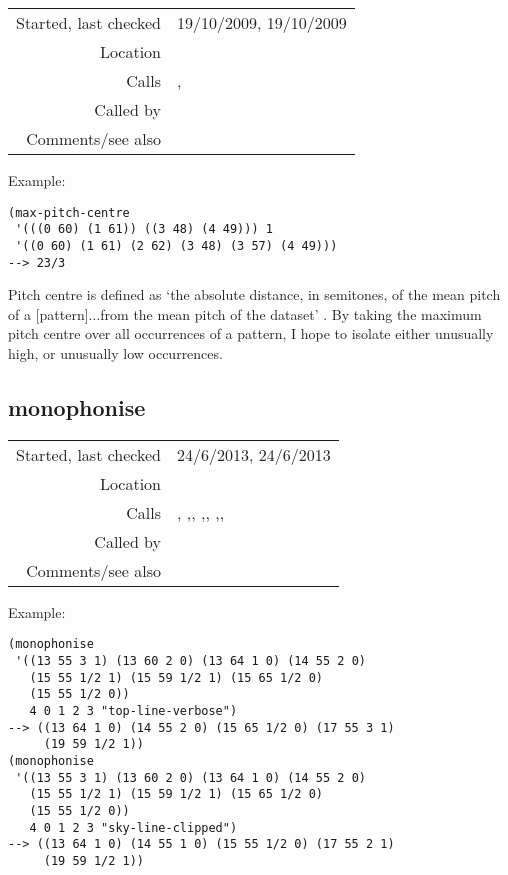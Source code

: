 \vspace{0.3cm}
\begin{tabular}{r|p{8cm}}
Started, last checked & 19/10/2009, 19/10/2009 \\
Location & \nameref{sec:musical-properties} \\
Calls & \nameref{fun:mean}, \nameref{fun:nth-list-of-lists} \\
Called by & \\
Comments/see also &
\end{tabular}

\vspace{0.5cm}
\noindent Example:
\begin{verbatim}
(max-pitch-centre
 '(((0 60) (1 61)) ((3 48) (4 49))) 1
 '((0 60) (1 61) (2 62) (3 48) (3 57) (4 49)))
--> 23/3
\end{verbatim}

\noindent Pitch centre is defined as `the absolute
distance, in semitones, of the mean pitch of a
[pattern]$\ldots$from the mean pitch of the dataset'
\citep[p.~78]{pearce2007}. By taking the maximum pitch
centre over all occurrences of a pattern, I hope to
isolate either unusually high, or unusually low
occurrences.


\subsection*{monophonise}\label{fun:monophonise}

\vspace{0.3cm}
\begin{tabular}{r|p{8cm}}
Started, last checked & 24/6/2013, 24/6/2013 \\
Location & \nameref{sec:musical-properties} \\
Calls & \nameref{fun:add-to-nth}, \nameref{fun:constant-vector},\newline \nameref{fun:dataset-restricted-to-m-in-nth}, \nameref{fun:max-item},\newline \nameref{fun:nth-list-of-lists}, \nameref{fun:sky-line-clipped},\newline \nameref{fun:top-line-verbose}, \nameref{fun:translation} \\
Called by & \\
Comments/see also &
\end{tabular}

\vspace{0.5cm}
\noindent Example:
\begin{verbatim}
(monophonise
 '((13 55 3 1) (13 60 2 0) (13 64 1 0) (14 55 2 0)
   (15 55 1/2 1) (15 59 1/2 1) (15 65 1/2 0)
   (15 55 1/2 0))
   4 0 1 2 3 "top-line-verbose")
--> ((13 64 1 0) (14 55 2 0) (15 65 1/2 0) (17 55 3 1)
     (19 59 1/2 1))
(monophonise
 '((13 55 3 1) (13 60 2 0) (13 64 1 0) (14 55 2 0)
   (15 55 1/2 1) (15 59 1/2 1) (15 65 1/2 0)
   (15 55 1/2 0))
   4 0 1 2 3 "sky-line-clipped")
--> ((13 64 1 0) (14 55 1 0) (15 55 1/2 0) (17 55 2 1)
     (19 59 1/2 1))
\end{verbatim}

